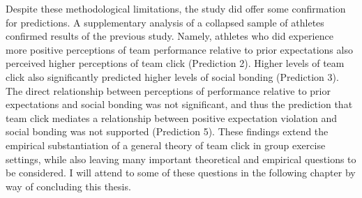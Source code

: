\begin{CJK}{UTF8}{gbsn}
Despite these methodological limitations, the study did offer some confirmation for predictions.  A supplementary analysis of a collapsed sample of athletes confirmed results of the previous study.  Namely, athletes who did experience more positive perceptions of team performance relative to prior expectations also perceived higher perceptions of team click (Prediction 2).  Higher levels of team click also significantly predicted higher levels of social bonding (Prediction 3).  The direct relationship between perceptions of performance relative to prior expectations and social bonding was not significant, and thus the prediction that team click mediates a relationship between positive expectation violation and social bonding was not supported (Prediction 5). These findings extend the empirical substantiation of a general theory of team click in group exercise settings, while also leaving many important theoretical and empirical questions to be considered.  I will attend to some of these questions in the following chapter by way of concluding this thesis.


                                                          \end{CJK}
